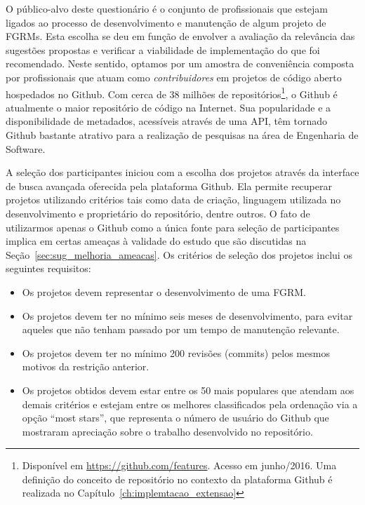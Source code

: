 O público-alvo deste questionário é o conjunto de profissionais que estejam
ligados ao processo de desenvolvimento e manutenção de algum projeto de FGRMs.
Esta escolha se deu em função de envolver a avaliação da relevância das
sugestões propostas e verificar a viabilidade de implementação do que foi
recomendado. Neste sentido, optamos por um amostra de conveniência composta por
profissionais que atuam como \textit{contribuidores} em projetos de código
aberto hospedados no Github. Com cerca de 38 milhões de
repositórios\footnote{Disponível em \url{https://github.com/features}. Acesso
    em junho/2016. Uma definição do conceito de repositório no contexto da
    plataforma Github é realizada no Capítulo~\ref{ch:implemtacao_extensao}}, o
Github é atualmente o maior repositório de código na Internet. Sua popularidade
e a disponibilidade de metadados, acessíveis através de uma API, têm tornado
Github bastante atrativo para a realização de pesquisas na área de Engenharia
de Software.

A seleção dos participantes iniciou com a escolha dos projetos através da
interface de busca avançada oferecida pela plataforma Github. Ela permite
recuperar projetos utilizando critérios tais como data de criação, linguagem
utilizada no desenvolvimento e proprietário do repositório, dentre outros. O
fato de utilizarmos apenas o Github como a única fonte para seleção de
participantes implica em certas ameaças à validade do estudo que são discutidas
na Seção~\ref{sec:sug_melhoria_ameacas}. Os critérios de seleção dos projetos
inclui os seguintes requisitos:

\begin{itemize}
	\item Os projetos devem representar o desenvolvimento de uma FGRM\@.
    \item Os projetos devem ter no mínimo seis meses de desenvolvimento, para
        evitar aqueles que não tenham passado por um tempo de manutenção
        relevante.
	\item Os projetos devem  ter  no  mínimo  200  revisões (commits)  pelos
		mesmos motivos  da restrição anterior.
    \item Os projetos obtidos devem estar entre os 50 mais populares que
        atendam aos demais critérios e estejam entre os melhores classificados
        pela ordenação via a opção ``most stars'', que representa o número de
        usuário do Github que mostraram apreciação sobre o trabalho
        desenvolvido no repositório.
\end{itemize}


